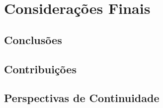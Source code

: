 \chapter{Considerações Finais} \label{cap:consideracoes}

\section{Conclusões}

\section{Contribuições}

\section{Perspectivas de Continuidade}